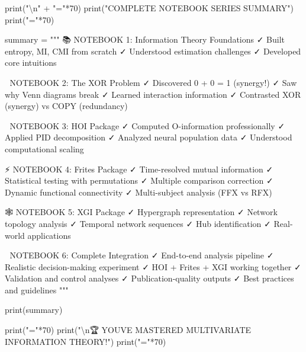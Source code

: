 \documentclass[
  11pt,
  letterpaper,
  oneside,
  openany]{book}
\newenvironment{Shaded}{\begin{snugshade}}{\end{snugshade}}
\newcommand{\BuiltInTok}[1]{\textcolor[rgb]{0.00,0.23,0.31}{#1}}
\newcommand{\CharTok}[1]{\textcolor[rgb]{0.13,0.47,0.30}{#1}}
\newcommand{\DecValTok}[1]{\textcolor[rgb]{0.68,0.00,0.00}{#1}}
\newcommand{\NormalTok}[1]{\textcolor[rgb]{0.00,0.23,0.31}{#1}}
\newcommand{\OperatorTok}[1]{\textcolor[rgb]{0.37,0.37,0.37}{#1}}
\newcommand{\StringTok}[1]{\textcolor[rgb]{0.13,0.47,0.30}{#1}}
\begin{document}
\begin{Shaded}
\begin{Highlighting}[]
\BuiltInTok{print}\NormalTok{(}\StringTok{"}\CharTok{\textbackslash{}n}\StringTok{"} \OperatorTok{+} \StringTok{"="}\OperatorTok{*}\DecValTok{70}\NormalTok{)}
\BuiltInTok{print}\NormalTok{(}\StringTok{"COMPLETE NOTEBOOK SERIES SUMMARY"}\NormalTok{)}
\BuiltInTok{print}\NormalTok{(}\StringTok{"="}\OperatorTok{*}\DecValTok{70}\NormalTok{)}

\NormalTok{summary }\OperatorTok{=} \StringTok{"""}
\StringTok{📚 NOTEBOOK 1: Information Theory Foundations}
\StringTok{   ✓ Built entropy, MI, CMI from scratch}
\StringTok{   ✓ Understood estimation challenges}
\StringTok{   ✓ Developed core intuitions}

\StringTok{🤯 NOTEBOOK 2: The XOR Problem}
\StringTok{   ✓ Discovered 0 + 0 = 1 (synergy!)}
\StringTok{   ✓ Saw why Venn diagrams break}
\StringTok{   ✓ Learned interaction information}
\StringTok{   ✓ Contrasted XOR (synergy) vs COPY (redundancy)}

\StringTok{🔬 NOTEBOOK 3: HOI Package}
\StringTok{   ✓ Computed O{-}information professionally}
\StringTok{   ✓ Applied PID decomposition}
\StringTok{   ✓ Analyzed neural population data}
\StringTok{   ✓ Understood computational scaling}

\StringTok{⚡ NOTEBOOK 4: Frites Package}
\StringTok{   ✓ Time{-}resolved mutual information}
\StringTok{   ✓ Statistical testing with permutations}
\StringTok{   ✓ Multiple comparison correction}
\StringTok{   ✓ Dynamic functional connectivity}
\StringTok{   ✓ Multi{-}subject analysis (FFX vs RFX)}

\StringTok{🕸️ NOTEBOOK 5: XGI Package}
\StringTok{   ✓ Hypergraph representation}
\StringTok{   ✓ Network topology analysis}
\StringTok{   ✓ Temporal network sequences}
\StringTok{   ✓ Hub identification}
\StringTok{   ✓ Real{-}world applications}

\StringTok{🎯 NOTEBOOK 6: Complete Integration}
\StringTok{   ✓ End{-}to{-}end analysis pipeline}
\StringTok{   ✓ Realistic decision{-}making experiment}
\StringTok{   ✓ HOI + Frites + XGI working together}
\StringTok{   ✓ Validation and control analyses}
\StringTok{   ✓ Publication{-}quality outputs}
\StringTok{   ✓ Best practices and guidelines}
\StringTok{"""}

\BuiltInTok{print}\NormalTok{(summary)}

\BuiltInTok{print}\NormalTok{(}\StringTok{"="}\OperatorTok{*}\DecValTok{70}\NormalTok{)}
\BuiltInTok{print}\NormalTok{(}\StringTok{"}\CharTok{\textbackslash{}n}\StringTok{🏆 YOU\textquotesingle{}VE MASTERED MULTIVARIATE INFORMATION THEORY!"}\NormalTok{)}
\BuiltInTok{print}\NormalTok{(}\StringTok{"="}\OperatorTok{*}\DecValTok{70}\NormalTok{)}
\end{Highlighting}
\end{Shaded}
\end{document}

